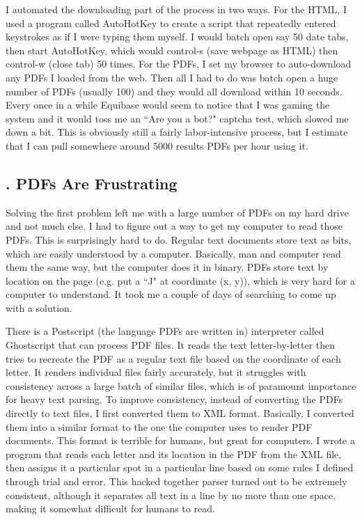 \documentclass{article}
\begin{document}
I automated the downloading part of the process in two ways. For the HTML, I used a program called AutoHotKey to create a script that repeatedly entered keystrokes as if I were typing them myself. I would batch open say 50 date tabs, then start AutoHotKey, which would control-s (save webpage as HTML) then control-w (close tab) 50 times. For the PDFs, I set my browser to auto-download any PDFs I loaded from the web. Then all I had to do was batch open a huge number of PDFs (usually 100) and they would all download within 10 seconds. Every once in a while Equibase would seem to notice that I was gaming the system and it would toss me an ``Are you a bot?" captcha test, which slowed me down a bit. This is obviously still a fairly labor-intensive process, but I estimate that I can pull somewhere around 5000 results PDFs per hour using it.

\subsection*{. PDFs Are Frustrating}

Solving the first problem left me with a large number of PDFs on my hard drive and not much else. I had to figure out a way to get my computer to read those PDFs. This is surprisingly hard to do. Regular text documents store text as bits, which are easily understood by a computer. Basically, man and computer read them the same way, but the computer does it in binary. PDFs store text by location on the page (e.g. put a ``J" at coordinate (x, y)), which is very hard for a computer to understand. It took me a couple of days of searching to come up with a solution. 

There is a Postscript (the language PDFs are written in) interpreter called Ghostscript that can process PDF files. It reads the text letter-by-letter then tries to recreate the PDF as a regular text file based on the coordinate of each letter. It renders individual files fairly accurately, but it struggles with consistency across a large batch of similar files, which is of paramount importance for heavy text parsing. To improve consistency, instead of converting the PDFs directly to text files, I first converted them to XML format. Basically, I converted them into a similar format to the one the computer uses to render PDF documents. This format is terrible for humans, but great for computers. I wrote a program that reads each letter and its location in the PDF from the XML file, then assigns it a particular spot in a particular line based on some rules I defined through trial and error. This hacked together parser turned out to be extremely consistent, although it separates all text in a line by no more than one space, making it somewhat difficult for humans to read.
\end{document}
